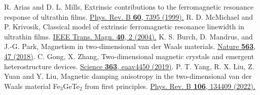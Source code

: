\documentclass[prl,aps,twocolumn,showpacs,citeautoscript,reprint,superscriptaddress]{revtex4-1}
\newcommand{\DOI}[1]{\href{https://doi.org/#1}}
\begin{document}
\begin{thebibliography}{00}
R. Arias and D. L. Mills, Extrinsic contributions to the ferromagnetic resonance response of ultrathin films. \DOI{10.1103/PhysRevB.60.7395}{Phys. Rev. B {\bf 60}, 7395 (1999).}
R. D. McMichael and P. Krivosik, Classical model of extrinsic ferromagnetic resonance linewidth in ultrathin films. \DOI{10.1109/TMAG.2003.821564}{IEEE Trans. Magn. {\bf 40}, 2 (2004).}
K. S. Burch, D. Mandrus, and J.-G. Park, Magnetism in two-dimensional van der Waals materials. \DOI{10.1038/s41586-018-0631-z}{Nature {\bf 563}, 47 (2018)}.
C. Gong, X. Zhang, Two-dimensional magnetic crystals and emergent heterostructure devices. \DOI{10.1126/science.aav4450}{Science {\bf 363}, eaav4450 (2019)}.	
P. T. Yang, R. X. Liu, Z. Yuan and Y. Liu, Magnetic damping anisotropy in the two-dimensional van der Waals material Fe$_3$GeTe$_2$ from first principles. \DOI{10.1103/PhysRevB.106.134409}{Phys. Rev. B {\bf 106}, 134409 (2022).}

\end{thebibliography}
	
\end{document}
